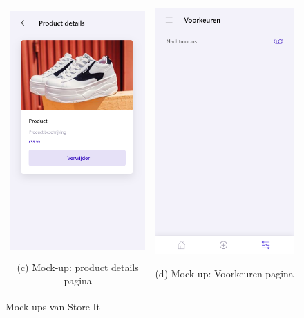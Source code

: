 \begin{figure}
\begin{tabular}{cc}
        \includegraphics[width=65mm]{img/methodologie/mock-details_screen.png} &   \includegraphics[width=65mm]{img/methodologie/mock-preferences.png} \\
        (c) Mock-up: product details pagina & (d) Mock-up: Voorkeuren pagina \\[6pt]
    \end{tabular}
    \caption{Mock-ups van Store It}
    \label{fig:mock-ups-store-it}
\end{figure}

